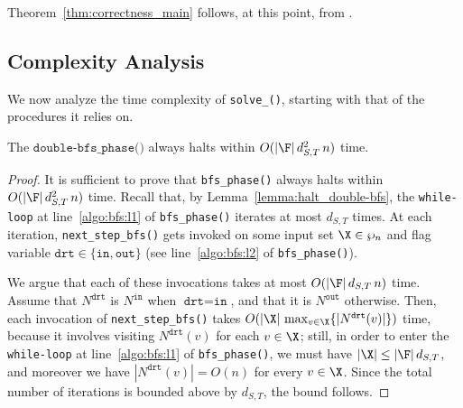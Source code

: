 \noindent Theorem~\ref{thm:correctness_main} follows, at this point,
from .

\subsection{Complexity Analysis}\label{subsect:complexity}

We now analyze the time complexity of \texttt{solve\_\mainproblem()}, starting with that of the procedures it relies on.

\begin{lemma}\label{lemma:complexity_double-bfs_phase}
The $\texttt{double-bfs\_phase()}$ always halts within $O(|\F|\, d^2_{S,T}\, n)$ time.
\end{lemma}
\begin{proof}
It is sufficient to prove that \texttt{bfs\_phase()} always halts within $O(|\F|\, d^2_{S,T}\, n)$ time.
Recall that, by Lemma~\ref{lemma:halt_double-bfs}, the \texttt{while-loop} at line~\ref{algo:bfs:l1} of \texttt{bfs\_phase()}
iterates at most $d_{S,T}$ times. At each iteration,
\texttt{next\_step\_bfs()} gets invoked on some input set
$\X\in\wp_n$
and flag variable $\texttt{drt}\in\{\texttt{in}, \texttt{out}\}$ (see line~\ref{algo:bfs:l2} of \texttt{bfs\_phase()}).


We argue that each of these invocations takes at most $O(|\F|\, d_{S,T}\, n)$ time.
Assume that $N^{\texttt{drt}}$ is $N^{\texttt{in}}$ when $\texttt{drt}=\texttt{in}$,
and that it is $N^{\texttt{out}}$ otherwise.
Then, each invocation of \texttt{next\_step\_bfs()} takes $O(|\X|\, \max_{v\in \X}\{|N^{\texttt{drt}}(v)|\})$
time,
because it involves visiting $N^{\texttt{drt}}(v)$ for each $v\in\X$;
still, in order to enter the \texttt{while-loop} at line~\ref{algo:bfs:l1} of \texttt{bfs\_phase()},
we must have $|\X|\leq |\F|\, d_{S,T}$,
and moreover we have $|N^{\texttt{drt}}(v)|=O(n)$ for every $v\in\X$.
Since the total number of iterations is bounded above by $d_{S,T}$, the bound follows.
\end{proof}

